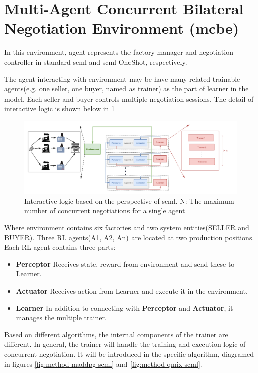 \section{Multi-Agent Concurrent Bilateral Negotiation Environment (\gls{mcbe})}
In this environment, agent represents the factory manager and negotiation controller in standard \gls{scml} and \gls{scml} OneShot, respectively.

The agent interacting with environment may be have many related trainable agents(e.g. one seller, one buyer, named as trainer) as the part of learner in the model. Each seller and buyer controls multiple negotiation sessions. The detail of interactive logic is shown below in \ref{fig:interacting-logic-scml}

\begin{figure}[htbp]
\centering
\includegraphics[width=1.0\textwidth]{./images/scnk.png}
\caption{Interactive logic based on the perspective of \gls{scml}. N: The maximum number of concurrent negotiations for a single agent}
\label{fig:interacting-logic-scml}
\end{figure}

Where environment contains six factories and two system entities(SELLER and BUYER). Three RL agents(A1, A2, An) are located at two production positions. Each RL agent contains three parts:

\begin{itemize}
\item \textbf{Perceptor} Receives state, reward from environment and send these to Learner.
\item \textbf{Actuator} Receives action from Learner and execute it in the environment.
\item \textbf{Learner} In addition to connecting with \textbf{Perceptor} and \textbf{Actuator}, it manages the multiple trainer.
\end{itemize}

Based on different algorithms, the internal components of the trainer are different. In general, the trainer will handle the training and execution logic of concurrent negotiation. It will be introduced in the specific algorithm, diagramed in figures \ref{fig:method-maddpg-scml} and \ref{fig:method-qmix-scml}.

